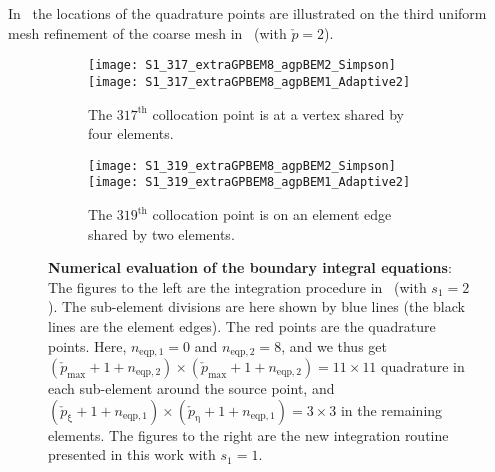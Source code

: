 In~ the locations of the quadrature points are illustrated on the third uniform mesh refinement of the coarse mesh in~ (with $\check{p}=2$). 
\begin{figure}
	\begin{subfigure}[t]{\textwidth}
		\centering
		\texttt{[image: S1\_317\_extraGPBEM8\_agpBEM2\_Simpson]}%
		\hspace*{0.02\textwidth}%
		\texttt{[image: S1\_317\_extraGPBEM8\_agpBEM1\_Adaptive2]}
		\caption{The $317^{\mathrm{th}}$ collocation point is at a vertex shared by four elements.}
	\end{subfigure}
	\par\bigskip
	\par\bigskip
	\begin{subfigure}[t]{\textwidth}
		\centering
		\texttt{[image: S1\_319\_extraGPBEM8\_agpBEM2\_Simpson]}%
		\hspace*{0.02\textwidth}%
		\texttt{[image: S1\_319\_extraGPBEM8\_agpBEM1\_Adaptive2]}
		\caption{The $319^{\mathrm{th}}$ collocation point is on an element edge shared by two elements.}
	\end{subfigure}
	\caption{\textbf{Numerical evaluation of the boundary integral equations}: The figures to the left are the integration procedure in~\cite{Simpson2014aib} (with $s_1=2$). The sub-element divisions are here shown by blue lines (the black lines are the element edges). The red points are the quadrature points. Here, $n_{\mathrm{eqp},1}=0$ and $n_{\mathrm{eqp},2}=8$, and we thus get $(\check{p}_{\mathrm{max}}+1+n_{\mathrm{eqp},2})\times(\check{p}_{\mathrm{max}}+1+n_{\mathrm{eqp},2})=11\times 11$ quadrature in each sub-element around the source point, and $(\check{p}_\upxi+1+n_{\mathrm{eqp},1})\times(\check{p}_\upeta+1+n_{\mathrm{eqp},1})=3\times 3$ in the remaining elements. The figures to the right are the new integration routine presented in this work with $s_1=1$.}
	\label{Fig3:Quadrature1}
\end{figure}
